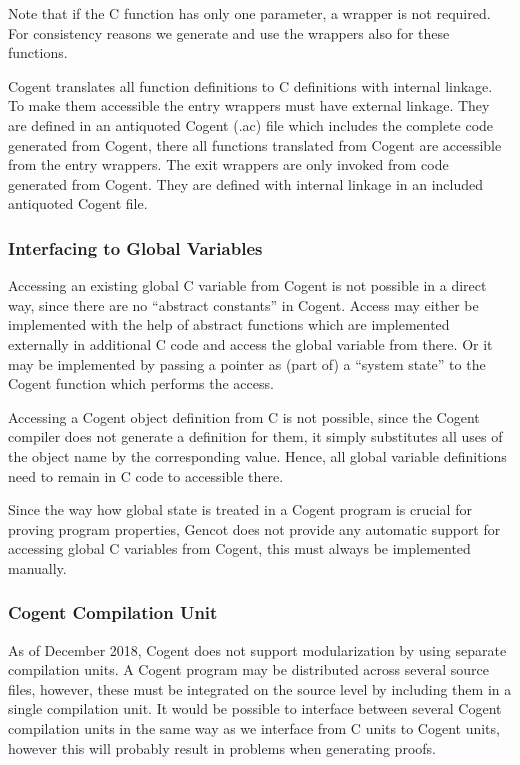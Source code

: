 \documentclass[a4paper]{report}
\begin{document}
Note that if the C function has only one parameter, a wrapper is not required. For consistency reasons we generate and use
the wrappers also for these functions.

Cogent translates all function definitions to C definitions with internal linkage. To make them accessible the entry wrappers
must have external linkage. They are defined in an antiquoted Cogent (.ac) file which includes the complete code generated from 
Cogent, there all functions translated from Cogent are accessible from the entry wrappers. The exit wrappers are only invoked 
from code generated from Cogent. They are defined with internal linkage in an included antiquoted Cogent file.

\subsubsection{Interfacing to Global Variables}

Accessing an existing global C variable from Cogent is not possible in a direct way, since there are no ``abstract constants'' in 
Cogent. Access may either be implemented with the help of abstract functions which are implemented externally in additional C code and
access the global variable from there. Or it may be implemented by passing a pointer as (part of) a ``system state'' to the
Cogent function which performs the access.

Accessing a Cogent object definition from C is not possible, since the Cogent compiler does not generate a definition for them, it
simply substitutes all uses of the object name by the corresponding value. Hence, all global variable definitions need to remain 
in C code to accessible there.

Since the way how global state is treated in a Cogent program is crucial for proving program properties, Gencot does not 
provide any automatic support for accessing global C variables from Cogent, this must always be implemented manually.

\subsubsection{Cogent Compilation Unit}

As of December 2018, Cogent does not support modularization by using separate compilation units. A Cogent program may be distributed
across several source files, however, these must be integrated on the source level by including them in a single compilation unit.
It would be possible to interface between several Cogent compilation units in the same way as we interface from C units to Cogent
units, however this will probably result in problems when generating proofs. 
\end{document}
